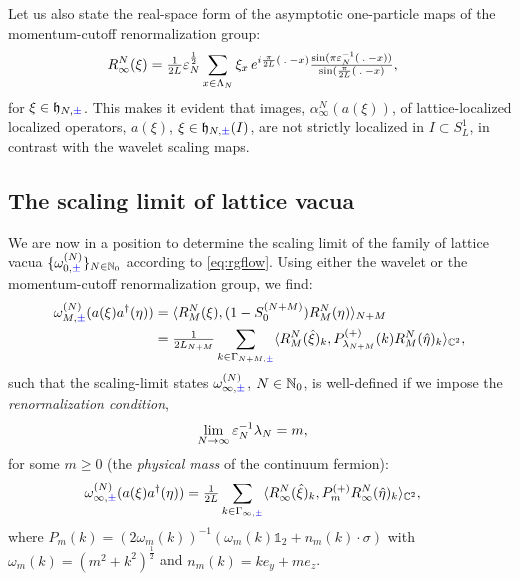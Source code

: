 \documentclass[a4paper, 11pt]{article}
\newcommand{\fh}{\mathfrak{h}}
\DeclareMathOperator{\1}{\mathds{1}}
\begin{document}
Let us also state the real-space form of the asymptotic one-particle maps of the momentum-cutoff renormalization group:
\begin{align}
\label{eq:momrg1preal}
R^{N}_{\infty}(\xi) & = \tfrac{1}{2L}\vep_{N}^{\frac{1}{2}}\sum_{x\in\Lambda_{N}}\xi_{x}\!\ e^{i\frac{\pi}{2L}(\!\ .\!\ -x)}\tfrac{\sin(\pi\vep_{N}^{-1}(\!\ .\!\ -x))}{\sin(\frac{\pi}{2L}(\!\ .\!\ -x)},
\end{align}
for $\xi\in\fh_{N,{\color{blue}\pm}}$. This makes it evident that images, $\alpha^{N}_{\infty}(a(\xi))$, of lattice-localized localized operators, $a(\xi)$, $\xi\in\fh_{N,{\color{blue}\pm}}(I)$, are not strictly localized in $I\subset S^{1}_{L}$, in contrast with the wavelet scaling maps.


\subsection{The scaling limit of lattice vacua}
\label{sec:latvaclim}
We are now in a position to determine the scaling limit of the family of lattice vacua $\{\omega^{(N)}_{0,{\color{blue}\pm}}\}_{N\in\mathbb{N}_{0}}$ according to \eqref{eq:rgflow}. Using either the wavelet or the momentum-cutoff renormalization group, we find:
\begin{align}
\label{eq:renvac}
\omega^{(N)}_{M,{\color{blue}\pm}}(a(\xi)a^{\dag}(\eta)) & = \langle R^{N}_{M}(\xi),(1-S^{(N+M)}_{0})R^{N}_{M}(\eta)\rangle_{N+M} \\ \nonumber
& = \tfrac{1}{2L_{N+M}}\sum_{k\in\Gamma_{N+M,{\color{blue}\pm}}}\langle R^{N}_{M}(\hat{\xi})_{k},P^{(+)}_{\lambda_{N+M}}(k)R^{N}_{M}(\hat{\eta})_{k}\rangle_{\C^{2}},
\end{align}
such that the scaling-limit states $\omega^{(N)}_{\infty,{\color{blue}\pm}}$, $N\in\mathbb{N}_{0}$, is well-defined if we impose the \textit{renormalization condition},
\begin{align}
\label{eq:rgcond}
\lim_{N\rightarrow\infty}\varepsilon_{N}^{-1}\lambda_{N} & = m,
\end{align}
for some $m\geq0$ (the \textit{physical mass} of the continuum fermion):
\begin{align}
\label{eq:scalinglim}
\omega^{(N)}_{\infty,{\color{blue}\pm}}(a(\xi)a^{\dag}(\eta)) & = \tfrac{1}{2L}\sum_{k\in\Gamma_{\infty,{\color{blue}\pm}}}\langle R^{N}_{\infty}(\hat{\xi})_{k},P^{(+)}_{m} R^{N}_{\infty}(\hat{\eta})_{k}\rangle_{\mathbb{C}^{2}},
\end{align}
where $P_{m}(k) = (2\omega_{m}(k))^{-1}(\omega_{m}(k)\mathds{1}_{2}+n_{m}(k)\cdot\sigma)$ with $\omega_{m}(k)=(m^{2}+k^{2})^{\frac{1}{2}}$ and $n_{m}(k) = k e_{y} + m e_{z}$.
\end{document}
